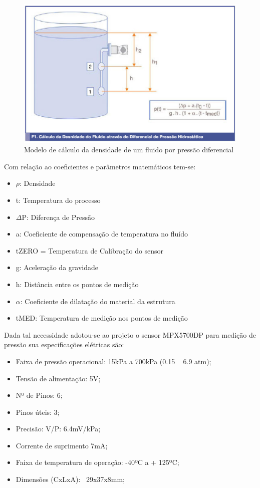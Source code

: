 \begin{figure}[h]
	\centering
	\includegraphics[keepaspectratio=true,scale=0.4]{figuras/densidade.eps}
	\caption{Modelo de cálculo da densidade de um fluido por pressão diferencial}
	\label{densidade}
\end{figure}

Com relação ao coeficientes e parâmetros matemáticos tem-se:

\begin{itemize}
\item \( \rho \): Densidade
\item t: Temperatura do processo
\item \( \Delta \)P: Diferença de Pressão
\item a: Coeficiente de compensação de temperatura no fluído
\item tZERO = Temperatura de Calibração do sensor
\item g: Aceleração da gravidade
\item h: Distância entre os pontos de medição
\item \( \alpha \): Coeficiente de dilatação do material da estrutura
\item tMED: Temperatura de medição nos pontos de medição
\end{itemize}

Dada tal necessidade adotou-se ao projeto o sensor MPX5700DP para medição de pressão sua especificações elétricas são:

\begin{itemize}
  \item Faixa de pressão operacional: 15kPa a 700kPa (0.15 ~ 6.9 atm);
  \item Tensão de alimentação: 5V;
  \item Nº de Pinos: 6;
  \item Pinos úteis: 3;
  \item Precisão: V/P: 6.4mV/kPa;
  \item Corrente de suprimento 7mA;
  \item Faixa de temperatura de operação: -40ºC a + 125ºC;
  \item Dimensões (CxLxA): ~29x37x8mm;
\end{itemize}

